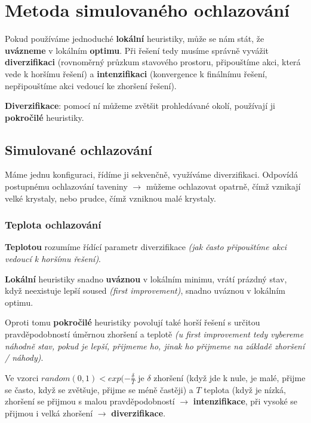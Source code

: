 \section{Metoda simulovaného ochlazování}

Pokud používáme jednoduché \textbf{lokální} heuristiky, může se nám stát, že \textbf{uvázneme} v lokálním \textbf{optimu}. Při řešení tedy musíme správně vyvážit \textbf{diverzifikaci} (rovnoměrný průzkum stavového prostoru, připouštíme akci, která vede k horšímu řešení) a \textbf{intenzifikaci} (konvergence k finálnímu řešení, nepřipouštíme akci vedoucí ke zhoršení řešení).

\vspace{4pt}
\noindent \textbf{Diverzifikace}: pomocí ní můžeme zvětšit prohledávané okolí, používají ji \textbf{pokro\-čilé} heuristiky.

\subsection{Simulované ochlazování}

Máme jednu konfiguraci, řídíme ji sekvenčně, využíváme diverzifikaci. Odpovídá postupnému ochlazování taveniny $\to$ můžeme ochlazovat opatrně, čímž vznikají velké krystaly, nebo prudce, čímž vzniknou malé krystaly.

\subsubsection*{Teplota ochlazování}

\textbf{Teplotou} rozumíme řídící parametr diverzifikace \textit{(jak často připouštíme akci vedoucí k horšímu řešení)}.

\vspace{4pt}
\noindent \textbf{Lokální} heuristiky snadno \textbf{uváznou} v lokálním minimu, vrátí prázdný stav, když neexistuje lepší soused \textit{(first improvement)}, snadno uváznou v lokálním optimu.

\vspace{4pt}
\noindent Oproti tomu \textbf{pokročilé} heuristiky povolují také horší řešení s určitou pravděpo\-dobností úměrnou zhoršení a teplotě \textit{(u first improvement tedy vybereme náhodně stav, pokud je lepší, přijmeme ho, jinak ho přijmeme na základě zhoršení / náhody)}.

\vspace{4pt}
\noindent Ve vzorci $random(0,1) < exp(- \frac{\delta}{T}$ je $\delta$ zhoršení (když jde k nule, je malé, přijme se často, když se zvětšuje, přijme se méně častěji) a $T$ teplota (když je nízká, zhoršení se přijmou s malou pravděpodobností $\to$ \textbf{intenzifikace}, při vysoké se přijmou i velká zhoršení $\to$ \textbf{diverzifikace}.

